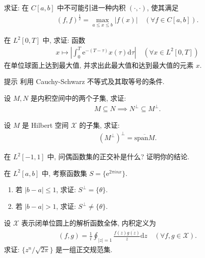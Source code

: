 \documentclass[../../main.tex]{subfiles}%
\begin{document}
\begin{example}
求证: 在 $C[a,b]$ 中不可能引进一种内积 $(\cdot,\cdot)$, 使其满足
\begin{align*}
(f,f)^\frac{1}{2}=\max_{a\leqslant x\leqslant b}|f(x)|\quad(\forall f\in C[a,b]).
\end{align*}
\end{example}

\begin{example}
在 $L^2[0,T]$ 中, 求证: 函数
\begin{align*}
x\mapsto\left|\int_0^T\mathrm{e}^{-(T-\tau)}x(\tau)\mathrm{d}\tau\right|\quad(\forall x\in L^2[0,T])
\end{align*}
在单位球面上达到最大值, 并求出此最大值和达到最大值的元素 $x$.
\end{example}
\begin{note}
提示 利用 Cauchy-Schwarz 不等式及其取等号的条件.
\end{note}

\begin{example}
设 $M,N$ 是内积空间中的两个子集, 求证:
\begin{align*}
M\subseteq N\implies N^\perp\subseteq M^\perp.
\end{align*}
\end{example}

\begin{example}
设 $M$ 是 Hilbert 空间 $\mathscr{X}$ 的子集, 求证:
\begin{align*}
(M^\perp)^\perp=\overline{\text{span}M}.
\end{align*}
\end{example}

\begin{example}
在 $L^2[-1,1]$ 中, 问偶函数集的正交补是什么? 证明你的结论.
\end{example}

\begin{example}
在 $L^2[a,b]$ 中, 考察函数集 $S=\{\mathrm{e}^{2\pi inx}\}$.
\begin{enumerate}[(1)]
\item 若 $|b-a|\leqslant 1$, 求证: $S^\perp=\{\theta\}$.
\item 若 $|b-a|>1$, 求证: $S^\perp\neq\{\theta\}$.
\end{enumerate}
\end{example}

\begin{example}
设 $\mathscr{X}$ 表示闭单位圆上的解析函数全体, 内积定义为
\begin{align*}
(f,g)=\frac{1}{i}\oint_{|z|=1}\frac{f(z)\overline{g(z)}}{z}\mathrm{d}z\quad(\forall f,g\in\mathscr{X}).
\end{align*}
求证: $\{z^n/\sqrt{2\pi}\}$ 是一组正交规范集.
\end{example}
\end{document}

